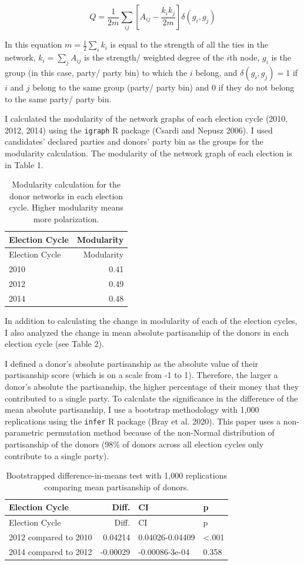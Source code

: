\documentclass[12pt,]{article}
\begin{document}
\[Q = \frac{1}{2m} \sum_{ij}\left[A_{ij} - \frac{k_{i}k_{j}}{2m} \right]\delta(g_{i},g_{j})\]

In this equation \(m = \frac{1}{2}\sum_{i}k_{i}\) is equal to the
strength of all the ties in the network, \(k_{i}=\sum_{j}A_{ij}\) is the
strength/ weighted degree of the \(i\)th node, \(g_{i}\) is the group
(in this case, party/ party bin) to which the \(i\) belong, and
\(\delta(g_{i},g_{j}) = 1\) if \(i\) and \(j\) belong to the same group
(party/ party bin) and 0 if they do not belong to the same party/ party
bin.

I calculated the modularity of the network graphs of each election cycle
(2010, 2012, 2014) using the \texttt{igraph} R package (Csardi and
Nepusz 2006). I used candidates' declared parties and donors' party bin
as the groups for the modularity calculation. The modularity of the
network graph of each election is in Table 1.

\begin{longtable}[]{@{}lr@{}}
\caption{Modularity calculation for the donor networks in each election
cycle. Higher modularity means more polarization.}\tabularnewline
\toprule
Election Cycle & Modularity\tabularnewline
\midrule
\endfirsthead
\toprule
Election Cycle & Modularity\tabularnewline
\midrule
\endhead
2010 & 0.41\tabularnewline
2012 & 0.49\tabularnewline
2014 & 0.48\tabularnewline
\bottomrule
\end{longtable}

In addition to calculating the change in modularity of each of the
election cycles, I also analyzed the change in mean absolute
partisanship of the donors in each election cycle (see Table 2).

I defined a donor's absolute partisanship as the absolute value of their
partisanship score (which is on a scale from -1 to 1). Therefore, the
larger a donor's absolute the partisanship, the higher percentage of
their money that they contributed to a single party. To calculate the
significance in the difference of the mean absolute partisanship, I use
a bootstrap methodology with 1,000 replications using the \texttt{infer}
R package (Bray et al. 2020). This paper uses a non-parametric
permutation method because of the non-Normal distribution of
partisanship of the donors (98\% of donors across all election cycles
only contribute to a single party).

\begin{longtable}[]{@{}lrll@{}}
\caption{Bootstrapped difference-in-means test with 1,000 replications
comparing mean partisanship of donors.}\tabularnewline
\toprule
Election Cycle & Diff. & CI & p\tabularnewline
\midrule
\endfirsthead
\toprule
Election Cycle & Diff. & CI & p\tabularnewline
\midrule
\endhead
2012 compared to 2010 & 0.04214 & 0.04026-0.04409 &
\textless.001\tabularnewline
2014 compared to 2012 & -0.00029 & -0.00086-3e-04 & 0.358\tabularnewline
\bottomrule
\end{longtable}
\end{document}
